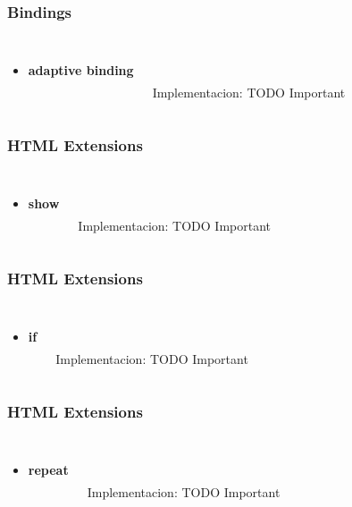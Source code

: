 \documentclass{beamer}
\begin{document}
\begin{frame}
\frametitle{Bindings}
\begin{columns}[c]
\begin{itemize}
\item \textbf{adaptive binding}
\end{itemize}

\\~\\
Implementacion: TODO Important
\end{columns}
\end{frame}
\begin{frame}
\frametitle{HTML Extensions}
\begin{columns}[c]
\begin{itemize}
\item \textbf{show}
\end{itemize}

\\~\\
Implementacion: TODO Important
\end{columns}
\end{frame}
\begin{frame}
\frametitle{HTML Extensions}
\begin{columns}[c]
\begin{itemize}
\item \textbf{if}
\end{itemize}

\\~\\
Implementacion: TODO Important
\end{columns}
\end{frame}
\begin{frame}
\frametitle{HTML Extensions}
\begin{columns}[c]
\begin{itemize}
\item \textbf{repeat}
\end{itemize}

\\~\\
Implementacion: TODO Important
\end{columns}
\end{frame}
\end{document}
